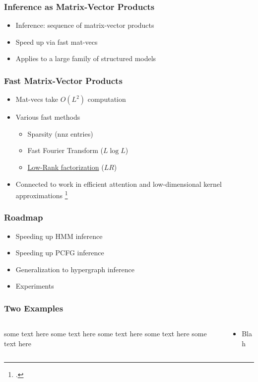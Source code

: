 \documentclass{beamer}
\begin{document}
\begin{frame}
\frametitle{Inference as Matrix-Vector Products}
\begin{itemize}
\item Inference: sequence of matrix-vector products
\vspace{1em}
\item Speed up via fast mat-vecs 
\vspace{1em}
\item Applies to a large family of structured models
\end{itemize}
\end{frame}

\begin{frame}
\frametitle{Fast Matrix-Vector Products}
\begin{itemize}
\item Mat-vecs take $O(L^2)$ computation
\vspace{1em}
\item Various fast methods
    \begin{itemize}
    \item Sparsity (nnz entries)
    \item Fast Fourier Transform ($L \log L$)
    \item \underline{Low-Rank factorization} ($LR$)
    \end{itemize}
\vspace{1em}
\item Connected to work in efficient attention and low-dimensional kernel approximations
\footcite{performer,rfa,blanc2018adaptive}
\end{itemize}
\end{frame}

\begin{frame}
\frametitle{Roadmap}
\begin{itemize}
\item Speeding up HMM inference
\vspace{1em}
\item Speeding up PCFG inference
\vspace{1em}
\item Generalization to hypergraph inference
\vspace{1em}
\item Experiments
\end{itemize}
\end{frame}

\begin{frame}
\frametitle{Two Examples}
\begin{columns}
\begin{column}{0.5\textwidth}
   some text here some text here some text here some text here some text here
\end{column}
\hspace{-50pt}
\vrule{}
\begin{column}{0.5\textwidth}  %
    \begin{itemize}
        \item Blah
    \end{itemize}
\end{column}
\end{columns}
\end{frame}
\end{document}
